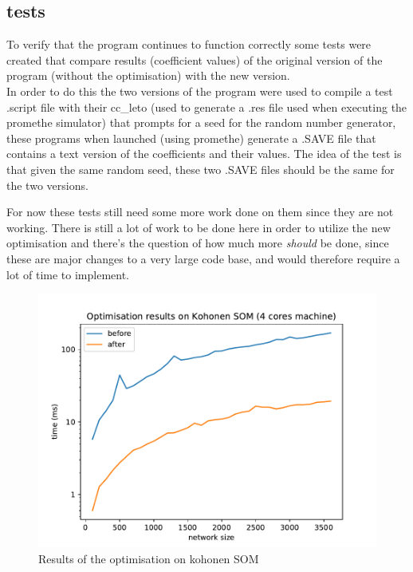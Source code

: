 \documentclass {article}
\begin{document}
\subsection{tests}
To verify that the program continues to function correctly some tests were created
that compare results (coefficient values) of the original version of the program
(without the optimisation) with the new version.\\

In order to do this the two versions of the program  were used to compile a test
.script file with their cc\_leto (used to generate a .res file used when
executing the promethe simulator) that prompts for a seed for the random number
generator, these programs when launched (using promethe) generate a .SAVE file
that contains a text version of the coefficients and their values. The idea of
the test is that given the same random seed, these two .SAVE files should be
the same for the two versions.

For now these tests still need some more work done on them since they are not
working. There is still a lot of work to be done here in order to utilize the new
optimisation and there's the question of how much more \textit{should} be done, 
since these are major changes to a very large code base, and would therefore
require a lot of time to implement.

\begin{figure}[H]
    \includegraphics[width=\linewidth]{plot/kohonenres.pdf}
    \caption{Results of the optimisation on kohonen SOM}
    \label{fig:kohonenres}
\end{figure}
\end{document}
